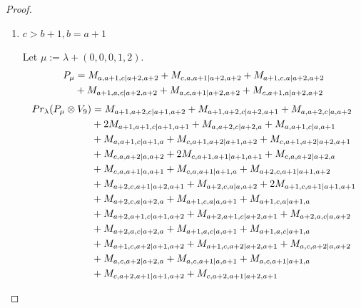 \begin{proof}
\begin{enumerate}
\begin{enumerate}
        \item $c>b+1, b=a+1$ \par
        Let $\mu:=\lambda + (0,0,0,1,2) $.
        \begin{equation}\notag
          \begin{aligned}
            P_\mu &= M_{a,a+1,c|a+2,a+2}
+ M_{c,a,a+1|a+2,a+2}
+ M_{a+1,c,a|a+2,a+2}\\
                                               &
+ M_{a+1,a,c|a+2,a+2}
+ M_{a,c,a+1|a+2,a+2}
+ M_{c,a+1,a|a+2,a+2}
          \end{aligned}
        \end{equation}
        \begin{equation}\notag
          \begin{aligned}
            Pr_{\lambda}(P_\mu \otimes V_{9}) &=
M_{a+1,a+2,c|a+1,a+2}
+ M_{a+1,a+2,c|a+2,a+1}
+ M_{a,a+2,c|a,a+2}\\
                                              &
+ 2M_{a+1,a+1,c|a+1,a+1}
+ M_{a,a+2,c|a+2,a}
+ M_{a,a+1,c|a,a+1}\\
                                              &
+ M_{a,a+1,c|a+1,a}
+ M_{c,a+1,a+2|a+1,a+2}
+ M_{c,a+1,a+2|a+2,a+1}\\
                                              &
+ M_{c,a,a+2|a,a+2}
+ 2M_{c,a+1,a+1|a+1,a+1}
+ M_{c,a,a+2|a+2,a}\\
                                              &
+ M_{c,a,a+1|a,a+1}
+ M_{c,a,a+1|a+1,a}
+ M_{a+2,c,a+1|a+1,a+2}\\
                                              &
+ M_{a+2,c,a+1|a+2,a+1}
+ M_{a+2,c,a|a,a+2}
+ 2M_{a+1,c,a+1|a+1,a+1}\\
                                              &
+ M_{a+2,c,a|a+2,a}
+ M_{a+1,c,a|a,a+1}
+ M_{a+1,c,a|a+1,a}\\
                                              &
+ M_{a+2,a+1,c|a+1,a+2}
+ M_{a+2,a+1,c|a+2,a+1}
+ M_{a+2,a,c|a,a+2}\\
                                              &
+ M_{a+2,a,c|a+2,a}
+ M_{a+1,a,c|a,a+1}
+ M_{a+1,a,c|a+1,a}\\
                                              &
+ M_{a+1,c,a+2|a+1,a+2}
+ M_{a+1,c,a+2|a+2,a+1}
+ M_{a,c,a+2|a,a+2}\\
                                              &
+ M_{a,c,a+2|a+2,a}
+ M_{a,c,a+1|a,a+1}
+ M_{a,c,a+1|a+1,a}\\
                                              &
+ M_{c,a+2,a+1|a+1,a+2}
+ M_{c,a+2,a+1|a+2,a+1}

\end{aligned}
\end{equation}
\end{enumerate}
\end{enumerate}
\end{proof}
